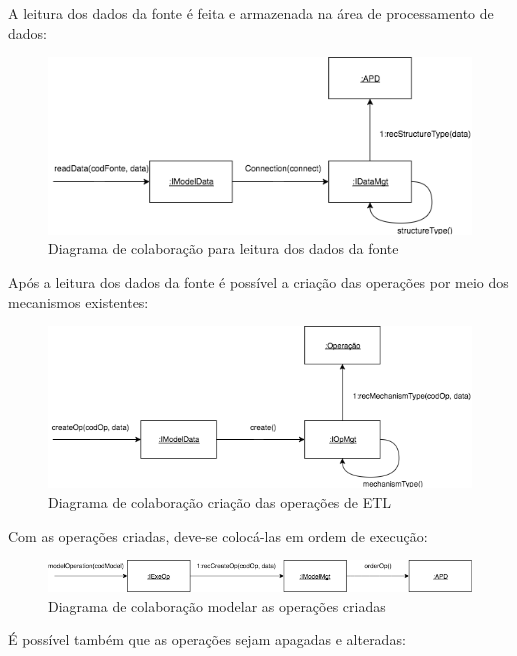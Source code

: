 A leitura dos dados da fonte é feita e armazenada na área de processamento de dados:

\begin{figure}[h]
	\centering
	\includegraphics[scale=0.5]{fig/readData.png}
	\caption{Diagrama de colaboração para leitura dos dados da fonte}
	\label{readData}
\end{figure}

Após a leitura dos dados da fonte é possível a criação das operações por meio dos mecanismos existentes:

\begin{figure}[h!]
	\centering
	\includegraphics[scale=0.5]{fig/createOp.png}
	\caption{Diagrama de colaboração criação das operações de ETL}
	\label{createOp}
\end{figure}

Com as operações criadas, deve-se colocá-las em ordem de execução:

\begin{figure}[h!]
	\centering
	\includegraphics[scale=0.5]{fig/modelOperation.png}
	\caption{Diagrama de colaboração modelar as operações criadas}
	\label{modelOperation}
\end{figure}

É possível também que as operações sejam apagadas e alteradas:


